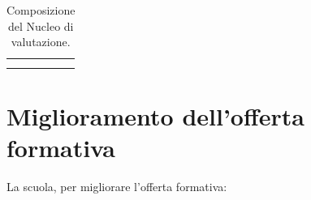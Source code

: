 \documentclass[12pt,a4paper,oneside]{memoir}
\begin{document}
\begin{table}[htp]
\caption{Composizione del Nucleo di valutazione.} \label{composizione-niv}
\footnotesize
\begin{tabular}{|>{\raggedright}p{6.277cm}|>{\raggedright\arraybackslash}p{6.277cm}|}
\hline
&\\\hline
&\\\hline
&\\\hline
\end{tabular}
\end{table}

\chapter[Miglioramento dell'offerta formativa]{Miglioramento dell'offerta formativa}
La scuola, per migliorare l'offerta formativa:
\end{document}

